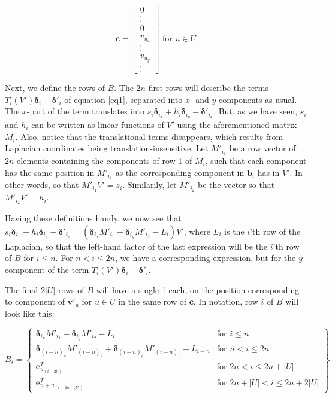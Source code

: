 \documentclass[english]{article}
\begin{document}
\[
\mathbf{c} = 
\begin{bmatrix}
  0 \\
  \vdots \\
  0 \\
  v_{u_x} \\
  \vdots \\
  v_{u_y} \\
  \vdots
\end{bmatrix}
\text{ for } u \in U
\]

Next, we define the rows of $B$. The $2n$ first rows will describe the terms $T_i(V')\mathbf{\delta}_i - \mathbf{\delta'}_i$ of equation \ref{eq1}, separated into $x$- and $y$-components as usual. The $x$-part of the term translates into $s_i\mathbf{\delta}_{i_x} + h_i\mathbf{\delta}_{i_y} - \mathbf{\delta'}_{i_x}$. But, as we have seen, $s_i$ and $h_i$ can be written as linear functions of $V'$ using the aforementioned matrix $M_i$. Also, notice that the translational terms disappears, which results from Laplacian coordinates being translation-insensitive. Let $M'_{i_1}$ be a row vector of $2n$ elements containing the components of row 1 of $M_i$, such that each component has the same position in $M'_{i_1}$ as the corresponding component in $\mathbf{b}_i$ has in $V'$. In other words, so that $M'_{i_1}V' = s_i$. Similarily, let $M'_{i_2}$ be the vector so that $M'_{i_2}V' = h_i$.

Having these definitions handy, we now see that $s_i\mathbf{\delta}_{i_x} + h_i\mathbf{\delta}_{i_y} - \mathbf{\delta'}_{i_x} = (\mathbf{\delta}_{i_x}M'_{i_1} + \mathbf{\delta}_{i_y}M'_{i_2} - L_i)V'$, where $L_i$ is the $i$'th row of the Laplacian, so that the left-hand factor of the last expression will be the $i$'th row of $B$ for $i \leq n$. For $n < i \leq 2n$, we have a corresponding expression, but for the $y$-component of the term $T_i(V') \mathbf{\delta}_i - \mathbf{\delta'}_i$.

The final $2|U|$ rows of $B$ will have a single 1 each, on the position corresponding to component of $\mathbf{v'}_u$ for $u \in U$ in the same row of $\mathbf{c}$. In notation, row $i$ of $B$ will look like this:

\[
B_i = \left\{\begin{array}{lr}
\mathbf{\delta}_{i_x}M'_{i_1} - \mathbf{\delta}_{i_y}M'_{i_2} - L_i & \text{for } i \leq n \\
\mathbf{\delta}_{{(i-n)}_x}M'_{{(i-n)}_2} + \mathbf{\delta}_{{(i-n)}_y}M'_{{(i-n)}_1} - L_{i-n} & \text{for } n < i \leq 2n \\
\mathbf{e}^T_{u_{(i - 2n)}} & \text{for } 2n < i \leq 2n + |U| \\
\mathbf{e}^T_{n + u_{(i - 2n - |U|)}} & \text{for } 2n + |U| < i \leq 2n + 2|U|
\end{array}\right\}
\]
\end{document}
